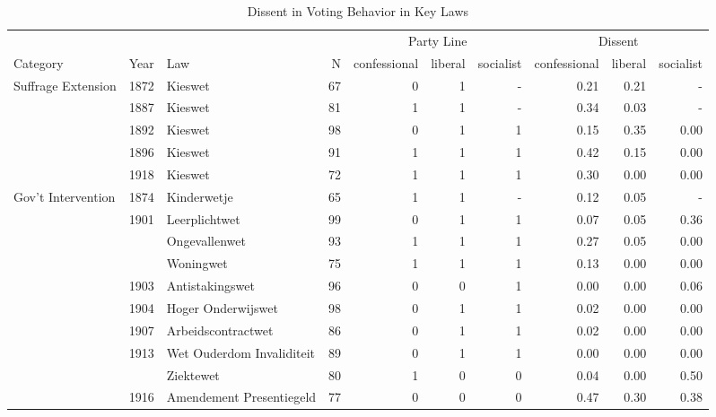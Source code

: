 \begin{table}

\caption{\label{tab:descriptivestats_dissent}Dissent in Voting Behavior in Key Laws}
\centering
\begin{tabular}[t]{lllrrrrrrr}
\toprule
\multicolumn{4}{c}{ } & \multicolumn{3}{c}{Party Line} & \multicolumn{3}{c}{Dissent} \\
\cmidrule(l{3pt}r{3pt}){5-7} \cmidrule(l{3pt}r{3pt}){8-10}
Category & Year & Law & N & confessional & liberal & socialist & confessional  & liberal  & socialist \\
\midrule
Suffrage Extension & 1872 & Kieswet & 67 & \num{0} & \num{1} & - & \num{0.21} & \num{0.21} & -\\
 & 1887 & Kieswet & 81 & \num{1} & \num{1} & - & \num{0.34} & \num{0.03} & -\\
 & 1892 & Kieswet & 98 & \num{0} & \num{1} & \num{1} & \num{0.15} & \num{0.35} & \num{0.00}\\
 & 1896 & Kieswet & 91 & \num{1} & \num{1} & \num{1} & \num{0.42} & \num{0.15} & \num{0.00}\\
 & 1918 & Kieswet & 72 & \num{1} & \num{1} & \num{1} & \num{0.30} & \num{0.00} & \num{0.00}\\
Gov't Intervention & 1874 & Kinderwetje & 65 & \num{1} & \num{1} & - & \num{0.12} & \num{0.05} & -\\
 & 1901 & Leerplichtwet & 99 & \num{0} & \num{1} & \num{1} & \num{0.07} & \num{0.05} & \num{0.36}\\
 &  & Ongevallenwet & 93 & \num{1} & \num{1} & \num{1} & \num{0.27} & \num{0.05} & \num{0.00}\\
 &  & Woningwet & 75 & \num{1} & \num{1} & \num{1} & \num{0.13} & \num{0.00} & \num{0.00}\\
 & 1903 & Antistakingswet & 96 & \num{0} & \num{0} & \num{1} & \num{0.00} & \num{0.00} & \num{0.06}\\
 & 1904 & Hoger Onderwijswet & 98 & \num{0} & \num{1} & \num{1} & \num{0.02} & \num{0.00} & \num{0.00}\\
 & 1907 & Arbeidscontractwet & 86 & \num{0} & \num{1} & \num{1} & \num{0.02} & \num{0.00} & \num{0.00}\\
 & 1913 & Wet Ouderdom Invaliditeit & 89 & \num{0} & \num{1} & \num{1} & \num{0.00} & \num{0.00} & \num{0.00}\\
 &  & Ziektewet & 80 & \num{1} & \num{0} & \num{0} & \num{0.04} & \num{0.00} & \num{0.50}\\
 & 1916 & Amendement Presentiegeld & 77 & \num{0} & \num{0} & \num{0} & \num{0.47} & \num{0.30} & \num{0.38}\\

\end{tabular}
\end{table}
